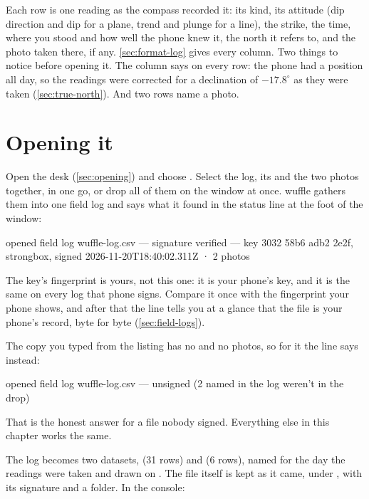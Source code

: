 Each row is one reading as the compass recorded it: its kind, its attitude (dip direction and dip for a
plane, trend and plunge for a line), the strike, the time, where you stood and how well the phone knew
it, the north it refers to, and the photo taken there, if any. \cref{sec:format-log} gives every column.
Two things to notice before opening it. The  column says  on every row: the phone
had a position all day, so the readings were corrected for a declination of $-17.8^\circ$ as they were
taken (\cref{sec:true-north}). And two rows name a photo.

\section{Opening it}\label{sec:wf-open}

Open the desk (\cref{sec:opening}) and choose . Select the log, its
 and the two photos together, in one go, or drop all of them on the window at once. wuffle
gathers them into one field log and says what it found in the status line at the foot of the window:

\begin{codeblock}
opened field log wuffle-log.csv — signature verified —
key 3032 58b6 adb2 2e2f, strongbox, signed 2026-11-20T18:40:02.311Z
· 2 photos
\end{codeblock}

The key's fingerprint is yours, not this one: it is your phone's key, and it is the same on every log
that phone signs. Compare it once with the fingerprint your phone shows, and after that the line tells
you at a glance that the file is your phone's record, byte for byte (\cref{sec:field-logs}).

The copy you typed from the listing has no  and no photos, so for it the line says instead:

\begin{codeblock}
opened field log wuffle-log.csv — unsigned (2 named in the log weren't in the drop)
\end{codeblock}

That is the honest answer for a file nobody signed. Everything else in this chapter works the same.


The log becomes two datasets,  (31 rows) and
 (6 rows), named for the day the readings were taken and drawn on
. The file itself is kept as it came, under , with its
signature and a  folder. In the console:

